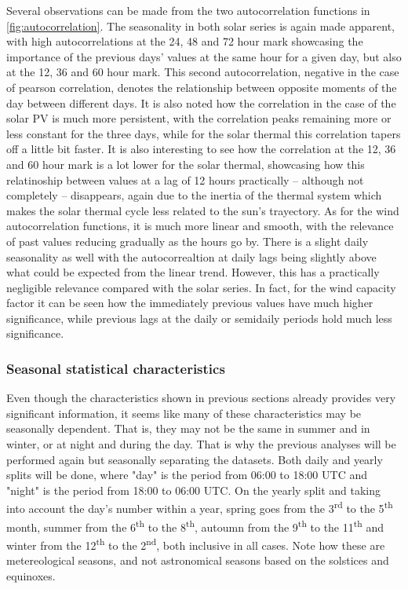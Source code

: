 Several observations can be made from the two autocorrelation functions in \autoref{fig:autocorrelation}. The seasonality in both solar series is again made apparent, with high autocorrelations at the 24, 48 and 72 hour mark showcasing the importance of the previous days' values at the same hour for a given day, but also at the 12, 36 and 60 hour mark. This second autocorrelation, negative in the case of pearson correlation, denotes the relationship between opposite moments of the day between different days. It is also noted how the correlation in the case of the solar PV is much more persistent, with the correlation peaks remaining more or less constant for the three days, while for the solar thermal this correlation tapers off a little bit faster. It is also interesting to see how the correlation at the 12, 36 and 60 hour mark is a lot lower for the solar thermal, showcasing how this relatinoship between values at a lag of 12 hours practically -- although not completely -- disappears, again due to the inertia of the thermal system which makes the solar thermal cycle less related to the sun's trayectory. As for the wind autocorrelation functions, it is much more linear and smooth, with the relevance of past values reducing gradually as the hours go by. There is a slight daily seasonality as well with the autocorrealtion at daily lags being slightly above what could be expected from the linear trend. However, this has a practically negligible relevance compared with the solar series. In fact, for the wind capacity factor it can be seen how the immediately previous values have much higher significance, while previous lags at the daily or semidaily periods hold much less significance. 

\subsubsection{Seasonal statistical characteristics}
Even though the characteristics shown in previous sections already provides very significant information, it seems like many of these characteristics may be seasonally dependent. That is, they may not be the same in summer and in winter, or at night and during the day. That is why the previous analyses will be performed again but seasonally separating the datasets. Both daily and yearly splits will be done, where "day" is the period from 06:00 to 18:00 UTC and "night" is the period from 18:00 to 06:00 UTC. On the yearly split and taking into account the day's number within a year, spring goes from the 3\textsuperscript{rd} to the 5\textsuperscript{th} month, summer from the 6\textsuperscript{th} to the 8\textsuperscript{th}, autoumn from the 9\textsuperscript{th} to the 11\textsuperscript{th} and winter from the 12\textsuperscript{th} to the 2\textsuperscript{nd}, both inclusive in all cases. Note how these are metereological seasons, and not astronomical seasons based on the solstices and equinoxes. 


